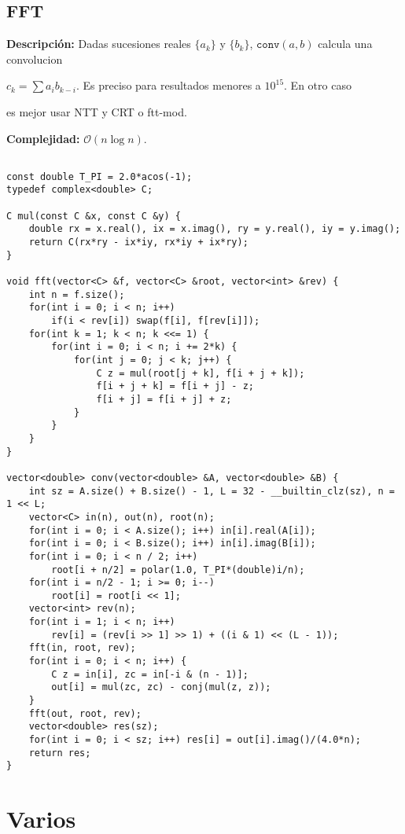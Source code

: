 \documentclass[twocolumn]{article}
\begin{document}
\subsection{FFT}
\begin{footnotesize}{\bf Descripción: } Dadas sucesiones reales $\{a_k\}$ y $\{b_k\}$, $\texttt{conv}(a, b)$ calcula una convolucion


$c_k = \sum a_ib_{k - i}$. Es preciso para resultados menores a $10^{15}$. En otro caso


es mejor usar NTT y CRT o ftt-mod.


{\bf Complejidad: } $\mathcal{O}(n \log n)$.
\end{footnotesize}\lstset{basicstyle=\footnotesize\ttfamily,breaklines=true,tabsize=2,language=C++,frame=leftline, numbers=left, numberstyle=\tiny, numbersep=5pt}
\begin{lstlisting}

const double T_PI = 2.0*acos(-1);
typedef complex<double> C;

C mul(const C &x, const C &y) {
	double rx = x.real(), ix = x.imag(), ry = y.real(), iy = y.imag();
	return C(rx*ry - ix*iy, rx*iy + ix*ry);
}

void fft(vector<C> &f, vector<C> &root, vector<int> &rev) {
	int n = f.size();
	for(int i = 0; i < n; i++)
		if(i < rev[i]) swap(f[i], f[rev[i]]);
	for(int k = 1; k < n; k <<= 1) {
		for(int i = 0; i < n; i += 2*k) {
			for(int j = 0; j < k; j++) {
				C z = mul(root[j + k], f[i + j + k]);
				f[i + j + k] = f[i + j] - z;
				f[i + j] = f[i + j] + z;
			}
		}
	}
}

vector<double> conv(vector<double> &A, vector<double> &B) {
	int sz = A.size() + B.size() - 1, L = 32 - __builtin_clz(sz), n = 1 << L;
	vector<C> in(n), out(n), root(n);
	for(int i = 0; i < A.size(); i++) in[i].real(A[i]);
	for(int i = 0; i < B.size(); i++) in[i].imag(B[i]);
	for(int i = 0; i < n / 2; i++)
		root[i + n/2] = polar(1.0, T_PI*(double)i/n);
	for(int i = n/2 - 1; i >= 0; i--)
		root[i] = root[i << 1];
	vector<int> rev(n);
	for(int i = 1; i < n; i++)
		rev[i] = (rev[i >> 1] >> 1) + ((i & 1) << (L - 1));
	fft(in, root, rev);
	for(int i = 0; i < n; i++) {
		C z = in[i], zc = in[-i & (n - 1)];
		out[i] = mul(zc, zc) - conj(mul(z, z));
	}
	fft(out, root, rev);
	vector<double> res(sz);
	for(int i = 0; i < sz; i++) res[i] = out[i].imag()/(4.0*n);
	return res;
}

\end{lstlisting}
\section{Varios}
\end{document}
